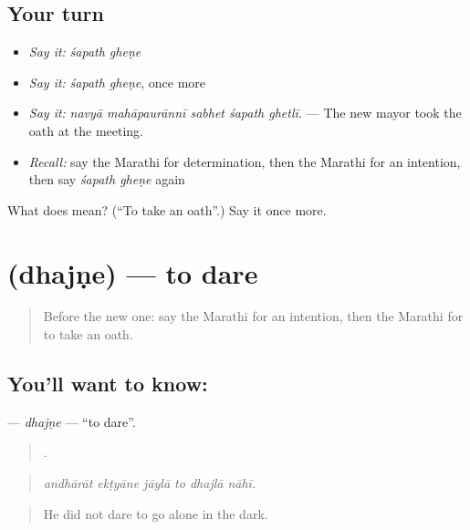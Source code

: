 \subsection*{Your turn}
\begin{itemize}
\raggedright
  \item \emph{Say it:} \emph{śapath gheṇe}
  \item \emph{Say it:} \emph{śapath gheṇe}, once more
  \item \emph{Say it:} \emph{navyā mahāpaurānnī sabhet śapath ghetlī.} — The new mayor took the oath at the meeting.
  \item \emph{Recall:} say the Marathi for determination, then the Marathi for an intention, then say \emph{śapath gheṇe} again
\end{itemize}

\begin{tcolorbox}[breakable,colback=teal!4,colframe=teal!35!black,title={Before you move on}]
What does   mean? (\textquotedblleft{}To take an oath\textquotedblright{}.) Say it once more.
\end{tcolorbox}
\section[\texorpdfstring{\mr{धजणे} (dhajṇe)}{धजणे (dhajṇe)}]{ (dhajṇe) — to dare}

\label{lesson:MR-C546-dhajne}



\begin{quote}
Before the new one: say the Marathi for an intention, then the Marathi for to take an oath.
\end{quote}

\subsection*{You'll want to know: }
\textbf{} — \emph{dhajṇe} — \textquotedblleft{}to dare\textquotedblright{}.

\begin{quote}
     .
\end{quote}

\begin{quote}
\emph{andhārāt ekṭyāne jāylā to dhajlā nāhī.}
\end{quote}

\begin{quote}
He did not dare to go alone in the dark.
\end{quote}

